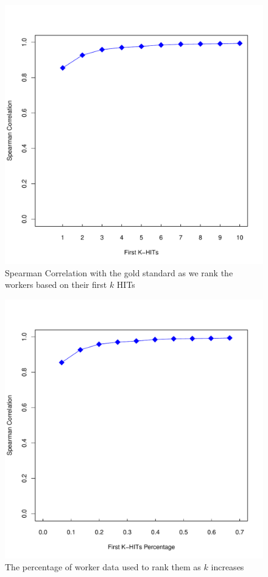 \documentclass[11pt]{article}
\begin{document}
    

\begin{figure}[htbp]
  \centering
  \includegraphics[width=\linewidth]{WorkerPerf/corr.pdf}
  \caption{Spearman Correlation with the gold standard as we rank the workers based on their first $k$ HITs}
    \label{fcorr}
\end{figure}

\begin{figure}[htbp]
  \centering
  \includegraphics[width=\linewidth]{WorkerPerf/corrnormalized.pdf}
  \caption{The percentage of worker data used to rank them as $k$ increases}
    \label{fcorrnor}
\end{figure}
\end{document}
